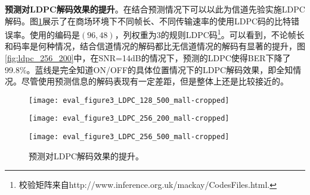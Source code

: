 \textbf{预测对LDPC解码效果的提升}。在结合预测情况下可以以此为信道先验实施LDPC解码。图\ref{fig:ldpc}展示了在商场环境下不同帧长、不同传输速率的使用LDPC码的比特错误率。使用的编码是$(96,48)$，列权重为$3$的规则LDPC码\footnote{校验矩阵来自http://www.inference.org.uk/mackay/CodesFiles.html.}。可以看到，不论帧长和码率是何种情况，结合信道情况的解码都比无信道情况的解码有显著的提升，图\ref{fig:ldpc_256_200}中，在SNR=14dB的情况下，预测的LDPC使得BER下降了99.8\%。蓝线是完全知道ON/OFF的具体位置情况下的LDPC解码效果，即全知情况。尽管使用预测信息的解码表现有一定差距，但是整体上还是比较接近的。
\begin{figure}[t]
	\begin{minipage}[b]{.32\linewidth}
		\texttt{[image: eval\_figure3\_LDPC\_128\_500\_mall-cropped]}
		\label{fig:ldpc_128_500}
	\end{minipage}
	\hfill
	\begin{minipage}[b]{.32\linewidth}
		\texttt{[image: eval\_figure3\_LDPC\_256\_200\_mall-cropped]}
		\label{fig:ldpc_256_200}
	\end{minipage}
	\hfill
	\begin{minipage}[b]{.32\linewidth}
		\texttt{[image: eval\_figure3\_LDPC\_256\_500\_mall-cropped]}
		\label{fig:ldpc_256_500}
	\end{minipage}
	\caption{预测对LDPC解码效果的提升。}\label{fig:ldpc}
\end{figure}


